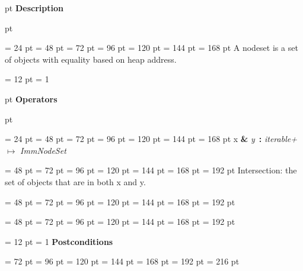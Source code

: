 {{{\par \pagebreak[3]  pt \noindent
{\Large {\bf Description\/}}\par {} pt
} \noindent
\par}
{\par \noindent  \leftskip = 24 pt  \leftmargini = 48 pt  \leftmarginii = 72 pt  \leftmarginiii = 96 pt  \leftmarginiv = 120 pt  \leftmarginv = 144 pt  \leftmarginvi = 168 pt A nodeset is a set of objects with equality based on heap address.
\par}
{\par \pagebreak[3.300000] \noindent \hangindent = 12 pt \hangafter = 1 
{\par \pagebreak[3]  pt \noindent
{\Large {\bf Operators\/}}\par {} pt
} \noindent
\par}
{\par \noindent  \leftskip = 24 pt  \leftmargini = 48 pt  \leftmarginii = 72 pt  \leftmarginiii = 96 pt  \leftmarginiv = 120 pt  \leftmarginv = 144 pt  \leftmarginvi = 168 pt x {\large {\bf {\&}\/}} {\em y\/}~{\bf :}  {\em iterable+\/} \(\mapsto \)  {\em ImmNodeSet\/}{\par \noindent
{\par \noindent  \leftskip = 48 pt  \leftmargini = 72 pt  \leftmarginii = 96 pt  \leftmarginiii = 120 pt  \leftmarginiv = 144 pt  \leftmarginv = 168 pt  \leftmarginvi = 192 pt 
Intersection: the set of objects that are in both x and y.\par}
{\par \noindent  \leftskip = 48 pt  \leftmargini = 72 pt  \leftmarginii = 96 pt  \leftmarginiii = 120 pt  \leftmarginiv = 144 pt  \leftmarginv = 168 pt  \leftmarginvi = 192 pt {\par \noindent
\par}
\par}
{\par \noindent  \leftskip = 48 pt  \leftmargini = 72 pt  \leftmarginii = 96 pt  \leftmarginiii = 120 pt  \leftmarginiv = 144 pt  \leftmarginv = 168 pt  \leftmarginvi = 192 pt {\par \noindent
{\par \pagebreak[3.100000] \noindent \hangindent = 12 pt \hangafter = 1 
{\bf Postconditions\/}\par}
{\par \noindent  \leftskip = 72 pt  \leftmargini = 96 pt  \leftmarginii = 120 pt  \leftmarginiii = 144 pt  \leftmarginiv = 168 pt  \leftmarginv = 192 pt  \leftmarginvi = 216 pt {\par \noindent
}}}}}}}
